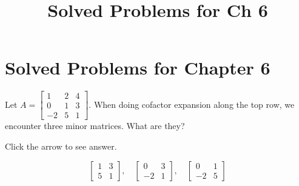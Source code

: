 \documentclass{ximera}
\title{Solved Problems for Ch 6} \license{CC BY-NC-SA 4.0}
\begin{document}
\begin{abstract}
\end{abstract}
\maketitle

\section*{Solved Problems for Chapter 6}

\begin{problem}\label{prb:7.2} Let $A = \left[ \begin{array}{rrr}
1 & 2 & 4 \\
0 & 1 & 3 \\
-2 & 5 & 1
\end{array} \right]$. When doing cofactor expansion along the top row, we encounter three minor matrices.  What are they?

Click the arrow to see answer.
\begin{expandable}
$$\begin{bmatrix}1&3\\5&1\end{bmatrix},\quad\begin{bmatrix}0&3\\-2&1\end{bmatrix},\quad\begin{bmatrix}0&1\\-2&5\end{bmatrix}$$
\end{expandable}
\end{problem}
\end{document}

